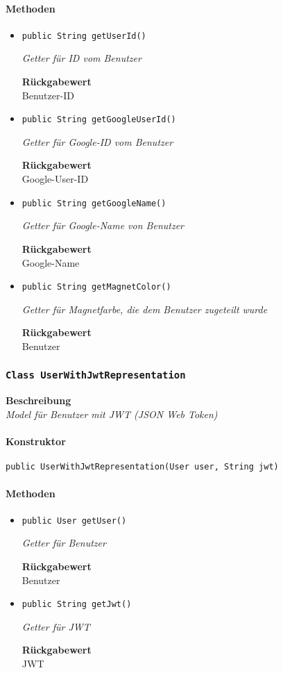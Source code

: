     \paragraph*{Methoden}
    \begin{itemize}
    	\item{\texttt{public String getUserId()}}
    	
    	\textit{Getter für ID vom Benutzer}
    	
    	
    	
    	\textbf{Rückgabewert} \\
    	Benutzer-ID        \item{\texttt{public String getGoogleUserId()}}
    	
    	\textit{Getter für Google-ID vom Benutzer}
    	
    	
    	
    	\textbf{Rückgabewert} \\
    	Google-User-ID        \item{\texttt{public String getGoogleName()}}
    	
    	\textit{Getter für Google-Name von Benutzer}
    	
    	
    	
    	\textbf{Rückgabewert} \\
    	Google-Name        \item{\texttt{public String getMagnetColor()}}
    	
    	\textit{Getter für Magnetfarbe, die dem Benutzer zugeteilt wurde}
    	
    	
    	
    	\textbf{Rückgabewert} \\
    	Benutzer
    \end{itemize}
    \subsubsection{\texttt{Class UserWithJwtRepresentation}}
    \textbf{Beschreibung} \\
    \textit{Model für Benutzer mit JWT (JSON Web Token)}
    \paragraph*{Konstruktor}
    \texttt{public UserWithJwtRepresentation(User user, String jwt)}
    \paragraph*{Methoden}
    \begin{itemize}
    	\item{\texttt{public User getUser()}}
    	
    	\textit{Getter für Benutzer}
    	
    	
    	
    	\textbf{Rückgabewert} \\
    	Benutzer        \item{\texttt{public String getJwt()}}
    	
    	\textit{Getter für JWT}
    	
    	
    	
    	\textbf{Rückgabewert} \\
    	JWT
    \end{itemize}
